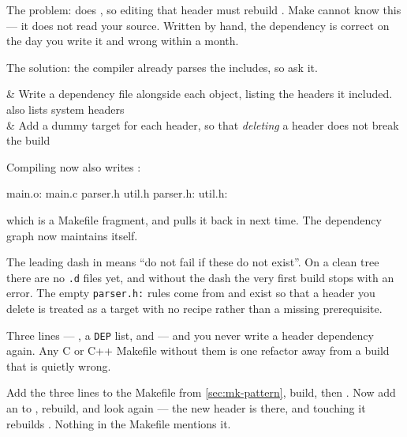 The problem:  does , so editing that
header must rebuild . Make cannot know this --- it does not read
your source. Written by hand, the dependency is correct on the day you write it
and wrong within a month.

The solution: the compiler already parses the includes, so ask it.

\begin{keys}[0.20]
	 & Write a dependency file alongside each object, listing the headers it included.  also lists system headers \\
	  & Add a dummy target for each header, so that \emph{deleting} a header does not break the build \\
\end{keys}


Compiling  now also writes :

\begin{makecode}
main.o: main.c parser.h util.h
parser.h:
util.h:
\end{makecode}

which is a Makefile fragment, and  pulls it back in next time.
The dependency graph now maintains itself.

\begin{note}
	The leading dash in  means ``do not fail if these do not exist''.
	On a clean tree there are no \texttt{.d} files yet, and without the dash the
	very first build stops with an error. The empty \texttt{parser.h:} rules come
	from  and exist so that a header you delete is treated as a target
	with no recipe rather than a missing prerequisite.
\end{note}

\begin{moral}
	Three lines --- , a \texttt{DEP} list, and  --- and
	you never write a header dependency again. Any C or C++ Makefile without them
	is one refactor away from a build that is quietly wrong.
\end{moral}

\begin{tryit}
	Add the three lines to the Makefile from \autoref{sec:mk-pattern}, build, then
	. Now add an  to , rebuild, and
	look again --- the new header is there, and touching it rebuilds
	. Nothing in the Makefile mentions it.
\end{tryit}
